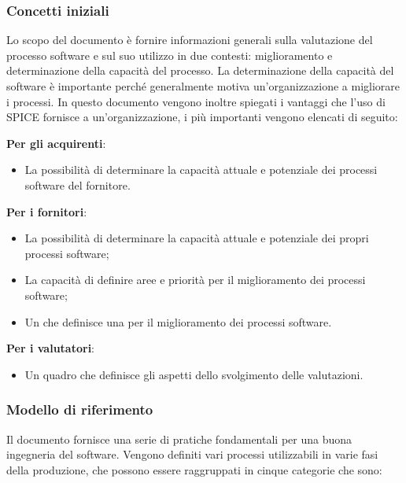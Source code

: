 \documentclass[../norme-di-progetto.tex]{subfiles}
\begin{document}
\subsubsection{Concetti iniziali}
\label{sub:concetti_iniziali}
Lo scopo del documento è fornire informazioni generali sulla valutazione del processo software e sul suo utilizzo in due contesti: miglioramento e determinazione della capacità del processo.
La determinazione della capacità del software è importante perché generalmente motiva un'organizzazione a migliorare i processi.
In questo documento vengono inoltre spiegati i vantaggi che l'uso di SPICE fornisce a un'organizzazione, i più importanti vengono elencati di seguito:


\textbf{Per gli acquirenti}:
\begin{itemize}
    \item La possibilità di determinare la capacità attuale e potenziale dei processi software del fornitore.
\end{itemize}

\textbf{Per i fornitori}:
\begin{itemize}
    \item La possibilità di determinare la capacità attuale e potenziale dei propri processi software;
    \item La capacità di definire aree e priorità per il miglioramento dei processi software;
    \item Un  che definisce una  per il miglioramento dei processi software.
\end{itemize}

\textbf{Per i valutatori}:
\begin{itemize}
    \item Un quadro che definisce gli aspetti dello svolgimento delle valutazioni.
\end{itemize}

\subsubsection{Modello di riferimento}
\label{sub:modello_di_riferimento}
Il documento fornisce una serie di pratiche fondamentali per una buona ingegneria del software.
Vengono definiti vari processi utilizzabili in varie fasi della produzione, che possono essere raggruppati in cinque categorie che sono:
\end{document}
